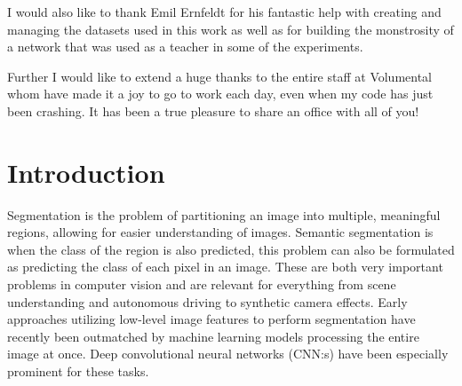 \documentclass{kththesis}
\begin{document}
I would also like to thank Emil Ernfeldt for his fantastic help with creating and
managing the datasets used in this work as well as for building the monstrosity
of a network that was used as a teacher in some of the experiments.

Further I would like to extend a huge thanks to the entire staff at Volumental whom have made it a joy to go to work
each day, even when my code has just been crashing. It has been a true pleasure to share an office with all of you!


\tableofcontents


\mainmatter


\chapter{Introduction}



Segmentation is the problem of partitioning an image into multiple, meaningful
regions, allowing for easier understanding of images. Semantic segmentation
is when the class of the region is also predicted, this problem can also be
formulated as predicting the class of each pixel in an image. These are both
very important problems in computer vision and are relevant for everything from
scene understanding and autonomous driving to synthetic camera effects. Early
approaches utilizing low-level image features to perform segmentation have
recently been outmatched by machine learning models processing the entire image
at once. Deep convolutional neural networks (CNN:s) have been especially
prominent for these tasks.
\end{document}
